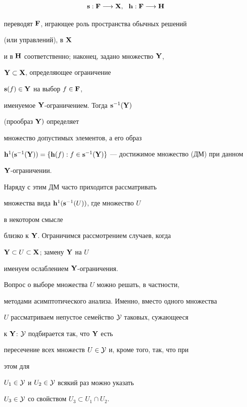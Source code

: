 $$


{\bold s}:{\bold F} \lo {\bold X},\ \ {\bold h}:{\bold F} \lo {\bold H}


$$


переводят ${\bold F}$, играющее роль пространства обычных решений


(или управлений), в ${\bold X}$


и в ${\bold H}$ соответственно; наконец, задано множество ${\bold Y}$,


${\bold Y} \subset {\bold X}$, определяющее ограничение


${{\bold s}(f)} \in {\bold Y}$ на выбор $f \in {\bold F}$,


именуемое ${\bold Y}$-ограничением. Тогда ${{\bold s}^{-1}}({\bold Y})$


(прообраз ${\bold Y})$ определяет


множество допустимых элементов, а его образ


${{\bold h}^1}({{\bold s}^{-1}}({\bold Y})) = \{{\bold h}(f):f \in


{{\bold s}^{-1}}({\bold Y})\}$ --- достижимое множество (ДМ) при данном


${\bold Y}$-ограничении.


Наряду с этим ДМ часто приходится рассматривать


множества вида ${{\bold h}^1}({{\bold s}^{-1}}(U))$, где множество $U$


в некотором смысле


близко к ${\bold Y}$. Ограничимся рассмотрением случаев, когда


${\bold Y} \subset U \subset {\bold X}$; замену ${\bold Y}$ на $U$


именуем ослаблением ${\bold Y}$-ограничения.


Вопрос о выборе множества $U$ можно решать, в частности,


методами асимптотического анализа. Именно, вместо одного множества


$U$ рассматриваем непустое семейство ${\cal Y}$ таковых, сужающееся


к ${\bold Y}$:\; ${\cal Y}$ подбирается так, что ${\bold Y}$ есть


пересечение всех множеств $U \in {\cal Y}$ и, кроме того, так, что при


этом для


${U_1} \in {\cal Y}$ и ${U_2} \in {\cal Y}$ всякий раз можно указать


${U_3} \in {\cal Y}$ со свойством ${U_3} \subset {U_1} \cap {U_2}$.


